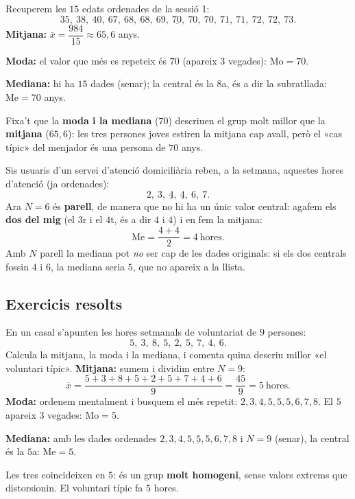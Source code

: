 \begin{exemple}
Recuperem les $15$ edats ordenades de la sessió 1:
\[
35,\ 38,\ 40,\ 67,\ 68,\ 68,\ 69,\ \underline{70},\ 70,\ 70,\ 71,\ 71,\ 72,\ 72,\ 73.
\]
\textbf{Mitjana:} $\overline{x}=\dfrac{\num{984}}{15}\approx 65,6$ anys.

\textbf{Moda:} el valor que més es repeteix és $70$ (apareix $3$ vegades): $\text{Mo}=70$.

\textbf{Mediana:} hi ha $15$ dades (senar); la central és la $8$a, és a dir la
subratllada: $\text{Me}=70$ anys.

Fixa't que la \textbf{moda i la mediana} ($70$) descriuen el grup molt millor que la
\textbf{mitjana} ($65,6$): les tres persones joves estiren la mitjana cap avall, però
el «cas típic» del menjador és una persona de $70$ anys.
\end{exemple}

\begin{exemple}
Sis usuaris d'un servei d'atenció domiciliària reben, a la setmana, aquestes hores
d'atenció (ja ordenades):
\[
2,\ 3,\ \underline{4},\ \underline{4},\ 6,\ 7.
\]
Ara $N=6$ és \textbf{parell}, de manera que no hi ha un únic valor central: agafem
els \textbf{dos del mig} (el $3$r i el $4$t, és a dir $4$ i $4$) i en fem la mitjana:
\[
\text{Me}=\frac{4+4}{2}=4\ \text{hores}.
\]
Amb $N$ parell la mediana pot \emph{no} ser cap de les dades originals: si els dos
centrals fossin $4$ i $6$, la mediana seria $5$, que no apareix a la llista.
\end{exemple}

\subsection{Exercicis resolts}

\begin{exresolt}
En un casal s'apunten les hores setmanals de voluntariat de $9$ persones:
\[
5,\ 3,\ 8,\ 5,\ 2,\ 5,\ 7,\ 4,\ 6.
\]
Calcula la mitjana, la moda i la mediana, i comenta quina descriu millor «el
voluntari típic».
\solucio
\textbf{Mitjana:} sumem i dividim entre $N=9$:
\[
\overline{x}=\frac{5+3+8+5+2+5+7+4+6}{9}=\frac{45}{9}=5\ \text{hores}.
\]
\textbf{Moda:} ordenem mentalment i busquem el més repetit:
$2,3,4,5,5,5,6,7,8$. El $5$ apareix $3$ vegades: $\text{Mo}=5$.

\textbf{Mediana:} amb les dades ordenades $2,3,4,5,\underline{5},5,6,7,8$ i $N=9$
(senar), la central és la $5$a: $\text{Me}=5$.

Les tres coincideixen en $5$: és un grup \textbf{molt homogeni}, sense valors
extrems que distorsionin. El voluntari típic fa $5$ hores.
\end{exresolt}

